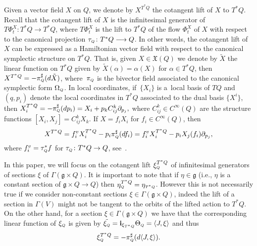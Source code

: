 \documentclass[pdftex]{sigma}
\numberwithin{equation}{section}
\def\g{\mathfrak{g}}
\def\subQQ{{\mbox{\tiny{$Q$}}}}
\begin{document}
Given a vector f\/ield $X$ on $Q$, we denote by $X^{T^*Q}$ the cotangent lift of $X$ to $T^*Q$.
Recall that the cotangent lift of $X$ is the inf\/initesimal generator of $T\Phi_t^X\colon T^*Q \to T^*Q$,
where $T\Phi^X_t$ is the lift to $T^*Q$ of the f\/low $\Phi_t^X$ of $X$ with respect
to the canonical projection $\tau_\subQQ\colon T^*Q\longrightarrow Q$.
In other words, the cotangent lift of $X$ can be expressed
as a Hamiltonian vector f\/ield with respect to the canonical symplectic structure on $T^*Q$.
That is, given $X\in \mathfrak{X}(Q)$ we denote by $\tilde{X}$ the linear function on $T^*Q$ given by
$\tilde{X} (\alpha) = \alpha(X)$ for $\alpha\in T^*Q$, then
$X^{T^*Q} = -\pi_{\mbox{\tiny{$Q$}}}^\sharp(d\tilde{X})$, where~$\pi_{\mbox{\tiny{$Q$}}}$
is the bivector f\/ield associated to the canonical symplectic form $\Omega_{\mbox{\tiny{$Q$}}}$.
In local coordinates, if~$\{X_i\}$ is a~local basis of $TQ$ and $(q,p_i)$
denote the local coordinates in $T^*Q$ associated to the dual basis $\{X^i\}$, then
$X_ i^{T^*Q} = - \pi_{\mbox{\tiny{$Q$}}}^\sharp(dp_i)= X_i + p_kC_{ij}^k\partial_{p_j},$
where $C_{ij}^k\in C^\infty(Q)$ are the structure functions $[X_i,X_j] = C_{ij}^k X_k$. If $X=f_i X_i$ for $f_i\in C^\infty(Q)$, then
\begin{gather*}
X^{T^*Q} = f_i^v X_i^{T^*Q} - p_i\pi_\subQQ^\sharp(df_i) = f^v_i X_i^{T^*Q} - p_iX_j(f_i)\partial_{p_j},
\end{gather*}
where $f^v_i = \tau_{\mbox{\tiny{$Q$}}}^*f$ for $\tau_{\mbox{\tiny{$Q$}}} \colon T^*Q\to Q$, see~\cite{MarsdenRatiuBook}.

In this paper, we will focus on the cotangent lift $\xi_{\mbox{\tiny{$Q$}}}^{T^*Q}$
of inf\/initesimal generators of sections $\xi$ of $\Gamma(\g \times Q)$.
It is important to note that if  $\eta\in \g$ (i.e., $\eta$ is a constant section of
$\g\times Q\to Q$) then $\eta_{\mbox{\tiny{$Q$}}}^{T^*Q} = \eta_{\mbox{\tiny{$T^*Q$}}}$.
However this is not necessarily true if we consider non-constant sections
$\xi\in \Gamma(\g\times Q)$, indeed the lift of a section in $\Gamma(V)$
might not be tangent to the orbits of the lifted action to $T^*Q$.
On the other hand, for a section $\xi\in \Gamma(\g\times Q)$ we have that the corresponding linear function of $\xi_\subQQ$ is given by
$\tilde{\xi_\subQQ} = {\bf i}_{\xi_{T^*Q}} \Theta_\subQQ = \langle J, \xi\rangle$
and thus
\begin{gather} \label{Eq:lift}
 \xi_\subQQ^{T^*Q} = - \pi_\subQQ^\sharp (d \langle J, \xi \rangle).
\end{gather}
\end{document}
